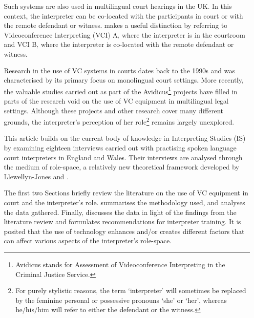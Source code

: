 \documentclass[output=paper]{langsci/langscibook}
\begin{document}
Such systems are also used in multilingual court hearings in the UK. In this context, the interpreter can be co-located with the participants in court or with the remote defendant or witness. \citet{Braun2011} makes a useful distinction by referring to Videoconference Interpreting (VCI) A, where the interpreter is in the courtroom and VCI B, where the interpreter is co-located with the remote defendant or witness. 

Research in the use of VC systems in courts dates back to the 1990s and was characterised by its primary focus on monolingual court settings. More recently, the valuable studies carried out as part of the Avidicus\footnote{Avidicus stands for Assessment of Videoconference Interpreting in the Criminal Justice Service.}  projects have filled in parts of the research void on the use of VC equipment in multilingual legal settings. Although these projects and other research cover many different grounds, the interpreter’s perception of her role\footnote{For purely stylistic reasons, the term ‘interpreter’ will sometimes be replaced by the feminine personal or possessive pronouns ‘she’ or ‘her’, whereas he/his/him will refer to either the defendant or the witness.} remains largely unexplored. 

This article builds on the current body of knowledge in Interpreting Studies (IS) by examining eighteen interviews carried out with practising spoken language court interpreters in England and Wales. Their interviews are analysed through the medium of role-space, a relatively new theoretical framework developed by Llewellyn-Jones and \citet{Lee2014}.

The first two Sections briefly review the literature on the use of VC equipment in court and the interpreter’s role.  summarises the methodology used, and  analyses the data gathered. Finally,  discusses the data in light of the findings from the literature review and formulates recommendations for interpreter training. It is posited that the use of technology enhances and/or creates different factors that can affect various aspects of the interpreter’s role-space.  
\end{document}

